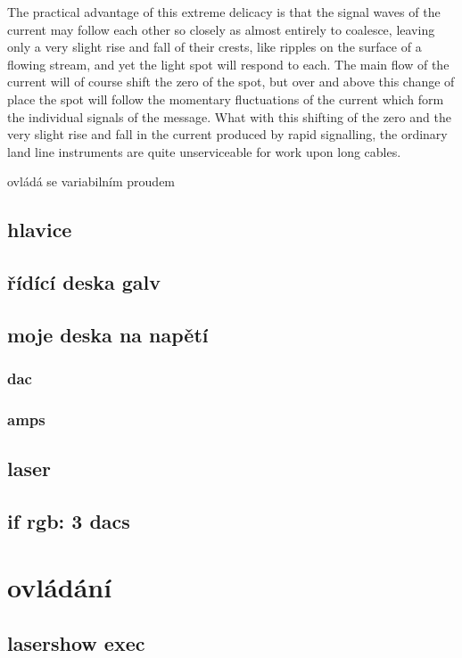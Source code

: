 \documentclass{template/socthesis}
\begin{document}
The practical advantage of this extreme delicacy is that the signal waves of the current may follow each other so closely as almost entirely to coalesce, leaving only a very slight rise and fall of their crests, like ripples on the surface of a flowing stream, and yet the light spot will respond to each. The main flow of the current will of course shift the zero of the spot, but over and above this change of place the spot will follow the momentary fluctuations of the current which form the individual signals of the message. What with this shifting of the zero and the very slight rise and fall in the current produced by rapid signalling, the ordinary land line instruments are quite unserviceable for work upon long cables.

ovládá se variabilním proudem

\section{hlavice}
\section{řídící deska galv}
\section{moje deska na napětí}
\subsection{dac}
\subsection{amps}

\section{laser}
\section{if rgb: 3 dacs}


\chapter{ovládání}
\section{lasershow exec}
\end{document}

